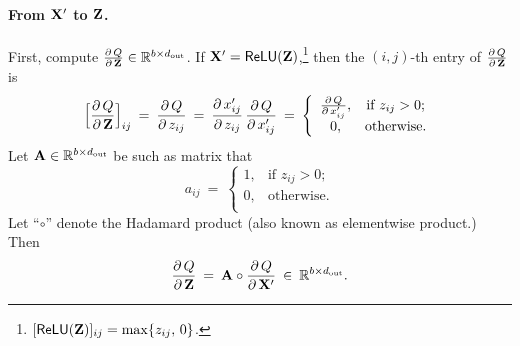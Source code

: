 \documentclass[11pt]{article}
\numberwithin{equation}{section}
\def\A{{\bf A}}
\def\X{{\bf X}}
\def\Z{{\bf Z}}
\def\RB{{\mathbb R}}
\def\dout{{d_{\textrm{out}}}}
\begin{document}
\paragraph{From $\X'$ to $\Z$.}
First, compute $\frac{\partial \, Q}{ \partial \, \Z}  \in \RB^{b\times \dout}$.
If $\X' = \textsf{ReLU} (\Z)$,\footnote{$[\textsf{ReLU} (\Z)]_{ij} = \max \{z_{ij} , \, 0 \}$.}
then the $(i,j)$-th entry of $\frac{\partial \, Q}{ \partial \, \Z} $ is
\begin{equation*}
    \Big[\frac{\partial \, Q}{ \partial \, \Z} \Big]_{ij}
    \: = \: \frac{\partial \, Q}{ \partial \, z_{ij}}
    \: = \:  \frac{\partial \, x_{ij}' }{ \partial \, z_{ij}} \,  \frac{\partial \, Q}{ \partial \, x_{ij}'}
    \: = \: 
    \left\{
    \begin{array}{cc}
         \tfrac{\partial \, Q}{ \partial \, x_{ij}'}, & \textrm{if } z_{ij} > 0;  \\
         0, & \textrm{otherwise.} \\
    \end{array}
    \right.
\end{equation*}
Let $\A \in \RB^{b\times \dout}$ be such as matrix that 
\begin{equation*}
    a_{ij} 
    \: = \: 
    \left\{
    \begin{array}{cc}
         1, & \textrm{if } z_{ij} > 0;  \\
         0, & \textrm{otherwise.} \\
    \end{array}
    \right.
\end{equation*}
Let ``$\circ $'' denote the Hadamard product (also known as elementwise product.)
Then
\begin{equation} \label{eq:grad_q_z}
    \frac{\partial \, Q}{ \partial \, \Z}
    \: = \: \A \circ  \frac{\partial \, Q}{ \partial \, \X'}
    \: \in \: \RB^{b\times \dout} .
\end{equation}
\end{document}
